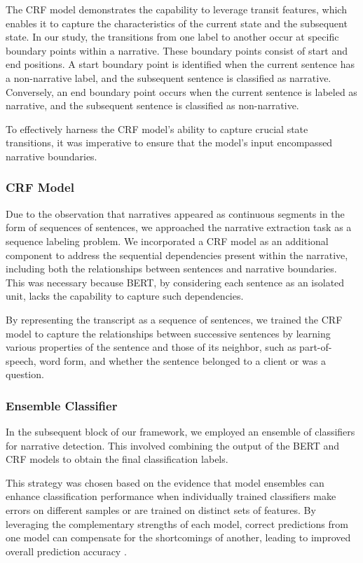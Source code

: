 \documentclass[preprint,12pt]{elsarticle}
\begin{document}
The CRF model demonstrates the capability to leverage transit features, which enables it to capture the characteristics of the current state and the subsequent state. In our study, the transitions from one label to another occur at specific boundary points within a narrative. These boundary points consist of start and end positions. A start boundary point is identified when the current sentence has a non-narrative label, and the subsequent sentence is classified as narrative. Conversely, an end boundary point occurs when the current sentence is labeled as narrative, and the subsequent sentence is classified as non-narrative.

To effectively harness the CRF model's ability to capture crucial state transitions, it was imperative to ensure that the model's input encompassed narrative boundaries. 

\subsubsection{CRF Model}

Due to the observation that narratives appeared as continuous segments in the form of sequences of sentences, we approached the narrative extraction task as a sequence labeling problem. We incorporated a CRF model as an additional component to address the sequential dependencies present within the narrative, including both the relationships between sentences and narrative boundaries. This was necessary because BERT, by considering each sentence as an isolated unit, lacks the capability to capture such dependencies.

By representing the transcript as a sequence of sentences, we trained the CRF model to capture the relationships between successive sentences by learning various properties of the sentence and those of its neighbor, such as part-of-speech, word form, and whether the sentence belonged to a client or was a question. 

\subsubsection{Ensemble Classifier}

In the subsequent block of our framework, we employed an ensemble of classifiers for narrative detection. This involved combining the output of the BERT and CRF models to obtain the final classification labels.

This strategy was chosen based on the evidence that model ensembles can enhance classification performance when individually trained classifiers make errors on different samples or are trained on distinct sets of features. By leveraging the complementary strengths of each model, correct predictions from one model can compensate for the shortcomings of another, leading to improved overall prediction accuracy \cite{zhuang2020comprehensive}.
\end{document}

